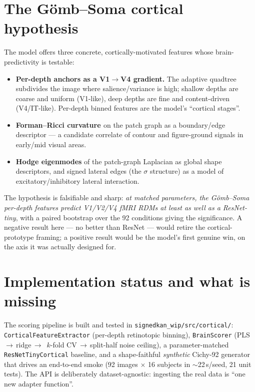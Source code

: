 \documentclass[11pt]{article}
\begin{document}
\section{The G\"omb--Soma cortical hypothesis}
The model offers three concrete, cortically-motivated features whose
brain-predictivity is testable:
\begin{itemize}[nosep]
  \item \textbf{Per-depth anchors as a V1$\to$V4 gradient.} The adaptive quadtree
        subdivides the image where salience/variance is high; shallow depths are
        coarse and uniform (V1-like), deep depths are fine and content-driven
        (V4/IT-like). Per-depth binned features are the model's ``cortical
        stages''.
  \item \textbf{Forman--Ricci curvature \cite{forman2003}} on the patch graph as a
        boundary/edge descriptor --- a candidate correlate of contour and
        figure-ground signals in early/mid visual areas.
  \item \textbf{Hodge eigenmodes} of the patch-graph Laplacian as global shape
        descriptors, and signed lateral edges (the $\sigma$ structure) as a model
        of excitatory/inhibitory lateral interaction.
\end{itemize}
The hypothesis is falsifiable and sharp: \emph{at matched parameters, the
G\"omb--Soma per-depth features predict V1/V2/V4 fMRI RDMs at least as well as a
ResNet-tiny}, with a paired bootstrap over the 92 conditions giving the
significance. A negative result here --- no better than ResNet --- would retire
the cortical-prototype framing; a positive result would be the model's first
genuine win, on the axis it was actually designed for.

\section{Implementation status and what is missing}
The scoring pipeline is built and tested in
\texttt{signedkan\_wip/src/cortical/}: \texttt{CorticalFeatureExtractor}
(per-depth retinotopic binning), \texttt{BrainScorer} (PLS\,$\to$\,ridge\,$\to$\,
$k$-fold CV\,$\to$\,split-half noise ceiling), a parameter-matched
\texttt{ResNetTinyCortical} baseline, and a shape-faithful \emph{synthetic}
Cichy-92 generator that drives an end-to-end smoke (92 images $\times$ 16
subjects in $\sim$22\,s/seed, 21 unit tests). The API is deliberately
dataset-agnostic: ingesting the real data is ``one new adapter function''.
\end{document}
